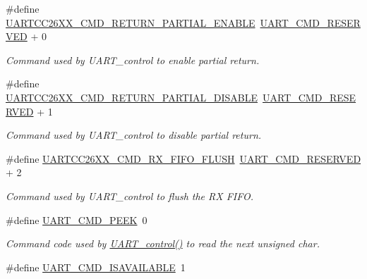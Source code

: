 \begin{DoxyCompactItemize}
\item 
\#define \hyperlink{group___u_a_r_t___c_m_d_ga90f59d674fd3b290c3dd711128413014}{U\+A\+R\+T\+C\+C26\+X\+X\+\_\+\+C\+M\+D\+\_\+\+R\+E\+T\+U\+R\+N\+\_\+\+P\+A\+R\+T\+I\+A\+L\+\_\+\+E\+N\+A\+B\+L\+E}~\hyperlink{group___u_a_r_t___c_o_n_t_r_o_l_ga0f5a809e0884da33fef102236eb51644}{U\+A\+R\+T\+\_\+\+C\+M\+D\+\_\+\+R\+E\+S\+E\+R\+V\+E\+D} + 0
\begin{DoxyCompactList}\small\item\em Command used by U\+A\+R\+T\+\_\+control to enable partial return. \end{DoxyCompactList}\item 
\#define \hyperlink{group___u_a_r_t___c_m_d_ga7cc7c1551022a60bd310c79acb6b26b8}{U\+A\+R\+T\+C\+C26\+X\+X\+\_\+\+C\+M\+D\+\_\+\+R\+E\+T\+U\+R\+N\+\_\+\+P\+A\+R\+T\+I\+A\+L\+\_\+\+D\+I\+S\+A\+B\+L\+E}~\hyperlink{group___u_a_r_t___c_o_n_t_r_o_l_ga0f5a809e0884da33fef102236eb51644}{U\+A\+R\+T\+\_\+\+C\+M\+D\+\_\+\+R\+E\+S\+E\+R\+V\+E\+D} + 1
\begin{DoxyCompactList}\small\item\em Command used by U\+A\+R\+T\+\_\+control to disable partial return. \end{DoxyCompactList}\item 
\#define \hyperlink{group___u_a_r_t___c_m_d_ga56280a288223c44c73a5169e957dc078}{U\+A\+R\+T\+C\+C26\+X\+X\+\_\+\+C\+M\+D\+\_\+\+R\+X\+\_\+\+F\+I\+F\+O\+\_\+\+F\+L\+U\+S\+H}~\hyperlink{group___u_a_r_t___c_o_n_t_r_o_l_ga0f5a809e0884da33fef102236eb51644}{U\+A\+R\+T\+\_\+\+C\+M\+D\+\_\+\+R\+E\+S\+E\+R\+V\+E\+D} + 2
\begin{DoxyCompactList}\small\item\em Command used by U\+A\+R\+T\+\_\+control to flush the R\+X F\+I\+F\+O. \end{DoxyCompactList}\item 
\#define \hyperlink{group___u_a_r_t___c_m_d_ga942596a37cb2109ae021f88f3d907bdc}{U\+A\+R\+T\+\_\+\+C\+M\+D\+\_\+\+P\+E\+E\+K}~0
\begin{DoxyCompactList}\small\item\em Command code used by \hyperlink{_u_a_r_t_8h_a9de3c26cfe4ce6b7f350a6ea6e16801d}{U\+A\+R\+T\+\_\+control()} to read the next unsigned char. \end{DoxyCompactList}\item 
\#define \hyperlink{group___u_a_r_t___c_m_d_gaf5be6db621c5b048637dc93b26797693}{U\+A\+R\+T\+\_\+\+C\+M\+D\+\_\+\+I\+S\+A\+V\+A\+I\+L\+A\+B\+L\+E}~1

\end{DoxyCompactItemize}
